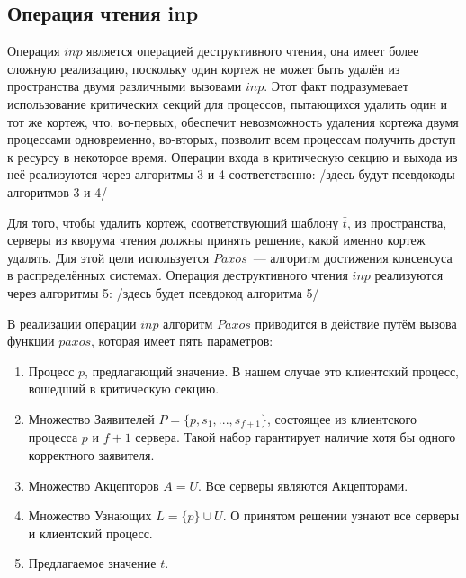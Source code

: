 \subsection{Операция чтения inp}\label{subsec5:3}
Операция $inp$ является операцией деструктивного чтения, она имеет более сложную реализацию, поскольку один кортеж не может быть удалён из пространства двумя различными вызовами $inp$. Этот факт подразумевает использование критических секций для процессов, пытающихся удалить один и тот же кортеж, что, во-первых, обеспечит невозможность удаления кортежа двумя процессами одновременно, во-вторых, позволит всем процессам получить доступ к ресурсу в некоторое время. Операции входа в критическую секцию и выхода из неё реализуются через алгоритмы 3 и 4 соответственно: /здесь будут псевдокоды алгоритмов 3 и 4/

Для того, чтобы удалить кортеж, соответствующий шаблону $\bar{t}$, из пространства, серверы из кворума чтения должны принять решение, какой именно кортеж удалять. Для этой цели используется $Paxos$~--- алгоритм достижения консенсуса в распределённых системах. Операция деструктивного чтения $inp$ реализуются через алгоритмы 5: /здесь будет псевдокод алгоритма 5/

В реализации операции $inp$ алгоритм $Paxos$ приводится в действие путём вызова функции $paxos$, которая имеет пять параметров: 
\begin{enumerate}
	\item Процесс $p$, предлагающий значение. В нашем случае это клиентский процесс, вошедший в критическую секцию.
	\item Множество Заявителей $P = \{p, s_1, ..., s_{f+1}\}$, состоящее из клиентского процесса $p$ и $f + 1$ сервера. Такой набор гарантирует наличие хотя бы одного корректного заявителя.
	\item Множество Акцепторов $A = U$. Все серверы являются Акцепторами.
	\item Множество Узнающих $L = \{p\} \cup U$. О принятом решении узнают все серверы и клиентский процесс.
	\item Предлагаемое значение $t$.
\end{enumerate}

